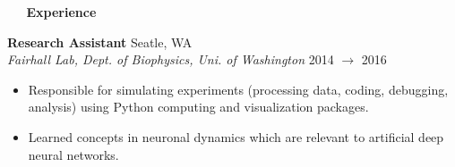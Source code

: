 \documentclass[a4paper,12pt]{article}
\newcommand{\resheading}[1]{{\vspace*{.06in} \colorbox{mygrey}{\begin{minipage}{\textwidth}{\textmd{\large \textbf{#1} \vphantom{p\^{E}}}}\end{minipage}}} }
\newcommand{\ressubheading}[4]{
        \textbf{#1} \hfill #2\\
        \textit{#3} \hfill #4 \\}
\begin{document}
%
%    
%    
%    
\resheading{~\faBriefcase~ Experience}


\ressubheading{Research Assistant}{Seatle, WA}{Fairhall Lab, Dept. of Biophysics, Uni. of Washington}{2014 $\rightarrow$ 2016}
\begin{itemize}[noitemsep,topsep=0pt,parsep=0pt,partopsep=0pt, nolistsep] \vspace{-10pt}
\item Responsible for simulating experiments (processing data, coding, debugging, analysis) using Python computing and visualization packages.
\item Learned concepts in neuronal dynamics which are relevant to artificial deep neural networks.\\
\end{itemize}
 
\end{document}
